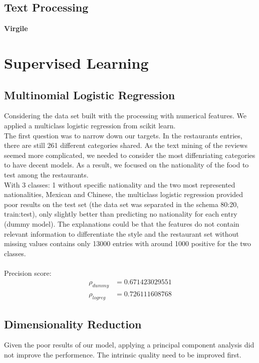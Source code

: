 \documentclass[submit]{harvardml}
\begin{document}
\subsection{Text Processing}

\textbf{Virgile}

\section{Supervised Learning} 

\subsection{Multinomial Logistic Regression}

Considering the data set built with the processing with numerical features. We applied a multiclass logistic regression from scikit learn. \\
The first question was to narrow down our targets. In the restaurants entries, there are still 261 different categories shared. As the text mining of the reviews seemed more complicated, we needed to consider the most diffenriating categories to have decent models. As a result, we focused on the nationality of the food to test among the restaurants.\\
With 3 classes: 1 without specific nationality and the two most represented nationalities, Mexican and Chinese, the multiclass logistic regression provided poor results on the test set (the data set was separated in the schema 80:20, train:test), only slightly better than predicting no nationality for each entry (dummy model). The explanations could be that the features do not contain relevant information to differentiate the style and the restaurant set without missing values contains only 13000 entries with around 1000 positive for the two classes.\\\\
Precision score:
\begin{align*}
	\rho_{dummy} & = 0.671423029551 \\
	\rho_{logreg} &  = 0.726111608768 
\end{align*}

\subsection{Dimensionality Reduction}

Given the poor results of our model, applying a principal component analysis did not improve the performence. The intrinsic quality need to be improved first. 
\end{document}
